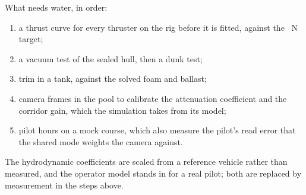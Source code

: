 \documentclass[10pt,a4paper]{article}
\begin{document}
What needs water, in order:
\begin{enumerate}
\item a thrust curve for every thruster on the rig before it is fitted,
against the \mthrustmax{}~N target;
\item a vacuum test of the sealed hull, then a dunk test;
\item trim in a tank, against the solved foam and ballast;
\item camera frames in the pool to calibrate the attenuation coefficient and
the corridor gain, which the simulation takes from its model;
\item pilot hours on a mock course, which also measure the pilot's read
error that the shared mode weights the camera against.
\end{enumerate}
The hydrodynamic coefficients are scaled from a reference vehicle rather than
measured, and the operator model stands in for a real pilot; both are
replaced by measurement in the steps above.
\end{document}
